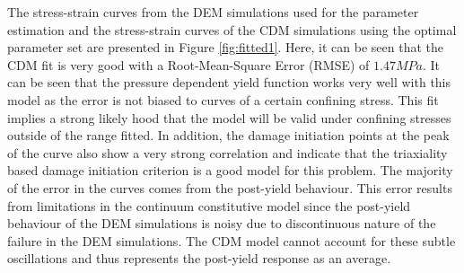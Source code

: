 The stress-strain curves from the DEM simulations used for the parameter estimation and the stress-strain curves of the CDM simulations using the optimal parameter set are presented in Figure \ref{fig:fitted1}. Here, it can be seen that the CDM fit is very good with a Root-Mean-Square Error (RMSE) of $1.47MPa$. It can be seen that the pressure dependent yield function works very well with this model as the error is not biased to curves of a certain confining stress. This fit implies a strong likely hood that the model will be valid under confining stresses outside of the range fitted. In addition, the damage initiation points at the peak of the curve also show a very strong correlation and indicate that the triaxiality based damage initiation criterion is a good model for this problem. The majority of the error in the curves comes from the post-yield behaviour. This error results from limitations in the continuum constitutive model since the post-yield behaviour of the DEM simulations is noisy due to discontinuous nature of the failure in the DEM simulations. The CDM model cannot account for these subtle oscillations and thus represents the post-yield response as an average. 
